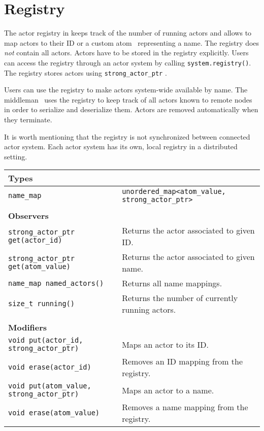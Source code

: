 \section{Registry}
\label{registry}

The actor registry in \lib keeps track of the number of running actors and allows to map actors to their ID or a custom atom~ representing a name. The registry does \emph{not} contain all actors. Actors have to be stored in the registry explicitly. Users can access the registry through an actor system by calling \lstinline^system.registry()^. The registry stores actors using \lstinline^strong_actor_ptr^ .

Users can use the registry to make actors system-wide available by name. The middleman~ uses the registry to keep track of all actors known to remote nodes in order to serialize and deserialize them. Actors are removed automatically when they terminate.

It is worth mentioning that the registry is not synchronized between connected actor system. Each actor system has its own, local registry in a distributed setting.

{\small
\begin{tabular*}{\textwidth}{m{}m{}}
  \multicolumn{2}{l}{\textbf{Types}\vspace{3pt}} \\
  \hline
  \lstinline^name_map^ & \lstinline^unordered_map<atom_value, strong_actor_ptr>^ \\
  \hline
  \\
  \multicolumn{2}{l}{\textbf{Observers}\vspace{3pt}} \\
  \hline
  \lstinline^strong_actor_ptr get(actor_id)^ & Returns the actor associated to given ID. \\
  \hline
  \lstinline^strong_actor_ptr get(atom_value)^ & Returns the actor associated to given name. \\
  \hline
  \lstinline^name_map named_actors()^ & Returns all name mappings. \\
  \hline
  \lstinline^size_t running()^ & Returns the number of currently running actors. \\
  \hline
  \\
  \multicolumn{2}{l}{\textbf{Modifiers}\vspace{3pt}} \\
  \hline
  \lstinline^void put(actor_id, strong_actor_ptr)^ & Maps an actor to its ID. \\
  \hline
  \lstinline^void erase(actor_id)^ & Removes an ID mapping from the registry. \\
  \hline
  \lstinline^void put(atom_value, strong_actor_ptr)^ & Maps an actor to a name. \\
  \hline
  \lstinline^void erase(atom_value)^ & Removes a name mapping from the registry. \\
  \hline
\end{tabular*}
}